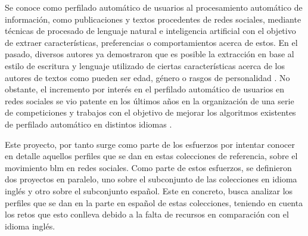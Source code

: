 Se conoce como perfilado automático de usuarios al procesamiento automático de información, como publicaciones y textos procedentes de redes sociales, mediante técnicas de procesado de lenguaje natural e inteligencia artificial con el objetivo de extraer características, preferencias o comportamientos acerca de estos. En el pasado, diversos autores ya demostraron que es posible la extracción en base al estilo de escritura y lenguaje utilizado de ciertas características acerca de los autores de textos como pueden ser edad, género o rasgos de personalidad \citep{personality_profiling, words-nerds}. No obstante, el incremento por interés en el perfilado automático de usuarios en redes sociales se vio patente en los últimos años en la organización de una serie de competiciones y trabajos con el objetivo de mejorar los algoritmos existentes de perfilado automático en distintos idiomas \citep{pan:2015,iberlef2022,profiling_urdu}.

Este proyecto, por tanto surge como parte de los esfuerzos por intentar conocer en detalle aquellos perfiles que se dan en estas colecciones de referencia, sobre el movimiento \acrshort{blm} en redes sociales. Como parte de estos esfuerzos, se definieron dos proyectos en paralelo, uno sobre el subconjunto de las colecciones en idioma inglés y otro sobre el subconjunto español. Este en concreto, busca analizar los perfiles que se dan en la parte en español de estas colecciones, teniendo en cuenta los retos que esto conlleva debido a la falta de recursos en comparación con el idioma inglés.
